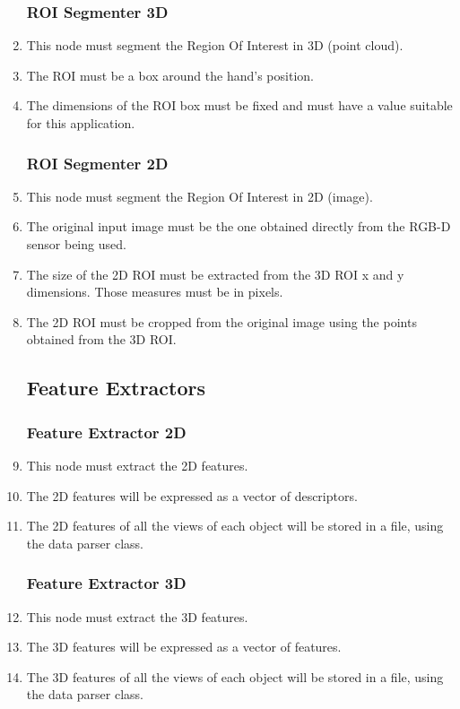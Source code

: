 \begin{enumerate}[label=\textbf{FR\threedigits*}, leftmargin=2cm]
   \subsubsection{ROI Segmenter 3D}
	\item This node must segment the Region Of Interest in 3D (point cloud). 
	\item The ROI must be a box around the hand's position. 
	\item The dimensions of the ROI box must be fixed and must have a value suitable for this application.  
   \subsubsection{ROI Segmenter 2D}
   	\item This node must segment the Region Of Interest in 2D (image).
   	\item The original input image must be the one obtained directly from the RGB-D sensor being used.
   	\item The size of the 2D ROI must be extracted from the 3D ROI x and y dimensions. Those measures must be in pixels. 
	\item The 2D ROI must be cropped from the original image using the points obtained from the 3D ROI. 

\subsection{Feature Extractors}
   \subsubsection{Feature Extractor 2D}
	\item This node must extract the 2D features. 
	\item The 2D features will be expressed as a vector of descriptors. %
	\item The 2D features of all the views of each object will be stored in a file, using the data parser class.  
  
  \subsubsection{Feature Extractor 3D}
   	\item This node must extract the 3D features. 
	\item The 3D features will be expressed as a vector of features. %
	\item The 3D features of all the views of each object will be stored in a file, using the data parser class.  


\end{enumerate}
